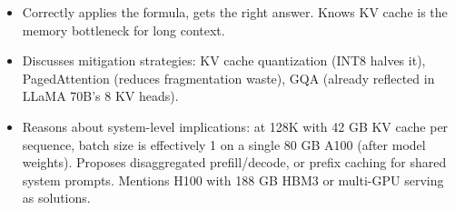 \begin{interviewq}
\goodgreat
\begin{itemize}
    \item {} Correctly applies the formula, gets the right answer. Knows KV cache is the memory bottleneck for long context.
    \item {} Discusses mitigation strategies: KV cache quantization (INT8 halves it), PagedAttention (reduces fragmentation waste), GQA (already reflected in LLaMA 70B's 8 KV heads).
    \item {} Reasons about system-level implications: at 128K with 42 GB KV cache per sequence, batch size is effectively 1 on a single 80 GB A100 (after model weights). Proposes disaggregated prefill/decode, or prefix caching for shared system prompts. Mentions H100 with 188 GB HBM3 or multi-GPU serving as solutions.
\end{itemize}

\end{interviewq}

